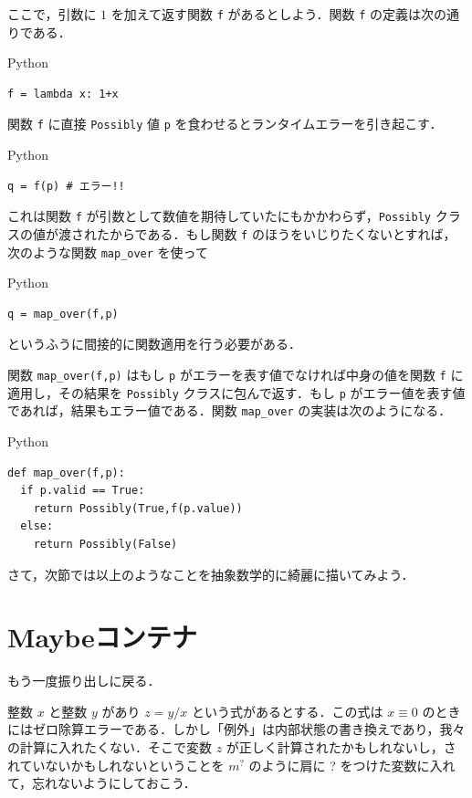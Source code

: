 \documentclass[a4paper]{jsbook}
\newcommand{\programminglanguage}[1]{\textsf{#1}}
\newcommand{\python}{\programminglanguage{Python}}
\newcommand{\code}[1]{\texttt{#1}}
\newenvironment{pythoncode}{\begin{itembox}[r]{\python}}{\end{itembox}}
\newcommand{\mMaybe}[1]{{#1}^\text{?}}
\begin{document}
ここで，引数に $1$ を加えて返す関数 \code{f} があるとしよう．関数 \code{f} の定義は次の通りである．
\begin{pythoncode}
\begin{verbatim}
f = lambda x: 1+x
\end{verbatim}
\end{pythoncode}

関数 \code{f} に直接 \code{Possibly} 値 \code{p} を食わせるとランタイムエラーを引き起こす．
\begin{pythoncode}
\begin{verbatim}
q = f(p) # エラー!!
\end{verbatim}
\end{pythoncode}
これは関数 \code{f} が引数として数値を期待していたにもかかわらず，\code{Possibly} クラスの値が渡されたからである．もし関数 \code{f} のほうをいじりたくないとすれば，次のような関数 \code{map\_over} を使って
\begin{pythoncode}
\begin{verbatim}
q = map_over(f,p)
\end{verbatim}
\end{pythoncode}
というふうに間接的に関数適用を行う必要がある．

関数 \code{map\_over(f,p)} はもし \code{p} がエラーを表す値でなければ中身の値を関数 \code{f} に適用し，その結果を \code{Possibly} クラスに包んで返す．もし \code{p} がエラー値を表す値であれば，結果もエラー値である．関数 \code{map\_over} の実装は次のようになる．
\begin{pythoncode}
\begin{verbatim}
def map_over(f,p):
  if p.valid == True:
    return Possibly(True,f(p.value))
  else:
    return Possibly(False)
\end{verbatim}
\end{pythoncode}

さて，次節では以上のようなことを抽象数学的に綺麗に描いてみよう．

\section{Maybeコンテナ}

もう一度振り出しに戻る．

整数 $x$ と整数 $y$ があり $z=y/x$ という式があるとする．この式は $x\equiv0$ のときにはゼロ除算エラーである．しかし「例外」は内部状態の書き換えであり，我々の計算に入れたくない．そこで変数 $z$ が正しく計算されたかもしれないし，されていないかもしれないということを $\mMaybe{m}$ のように肩に ? をつけた変数に入れて，忘れないようにしておこう．
\end{document}
